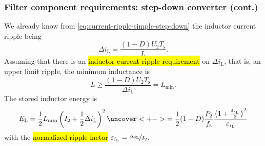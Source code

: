 \begin{frame}
    \frametitle{Filter component requirements: step-down converter (cont.)}
    \onslide<+->We already know from \eqref{eq:current-ripple-simple-step-down} the inductor current ripple being
    \begin{equation*}
        \Delta i_\mathrm{L} = \frac{(1-D)U_2T_\mathrm{s}}{L}.
    \end{equation*}\onslide<+->
    Assuming that there is an \hl{inductor current ripple requirement} on $\Delta i_\mathrm{L}$, that is, an upper limit ripple, the minimum inductance is
    \begin{equation}
        L \geq \frac{(1-D)U_2T_\mathrm{s}}{\Delta i_\mathrm{L}} = L_{\mathrm{min}}.
        \label{eq:inductor-minimum-inductance-step-down}
    \end{equation}\onslide<+->
    The stored inductor energy is
    \begin{equation}
        E_\mathrm{L} = \frac{1}{2} L_{\mathrm{min}} \left(I_2 + \frac{1}{2}\Delta i_\mathrm{L}\right)^2 \uncover<+->{= \frac{1}{2} (1-D)\frac{P_2}{f_\mathrm{s}}\frac{\left(1+\frac{\varepsilon_{i_\mathrm{L}}}{2}\right)^2}{\varepsilon_{i_\mathrm{L}}}}
    \end{equation}
    with the \hl{normalized ripple factor} $\varepsilon_{i_\mathrm{L}} = \nicefrac{\Delta i_\mathrm{L}}{I_2}$. 
\end{frame}


